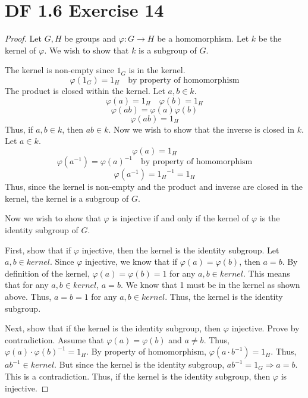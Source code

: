 \documentclass{article}
\begin{document}
\section{DF 1.6 Exercise 14}
\begin{proof}
Let $G, H$ be groups and $\varphi: G \rightarrow H$ be a homomorphism. Let $k$ be the kernel of $\varphi$. We wish to show that $k$ is a subgroup of $G$.

The kernel is non-empty since $1_G$ is in the kernel.
\[
\varphi(1_G) = 1_H \quad \textrm{by property of homomorphism}
\]
The product is closed within the kernel. Let $a, b \in k$.
\[
\varphi(a) = 1_H \quad \varphi(b) = 1_H
\]
\[
\varphi(ab) = \varphi(a)\varphi(b)
\]
\[
\varphi(ab) = 1_H
\]
Thus, if $a, b \in k$, then $ab \in k$. Now we wish to show that the inverse is closed in $k$. Let $a \in k$.
\[
\varphi(a) = 1_H
\]
\[
\varphi(a^{-1}) = \varphi(a)^{-1} \quad \textrm{by property of homomorphism}
\]
\[
\varphi(a^{-1}) = {1_H}^{-1} = 1_H
\]
Thus, since the kernel is non-empty and the product and inverse are closed in the kernel, the kernel is a subgroup of $G$.

Now we wish to show that $\varphi$ is injective if and only if the kernel of $\varphi$ is the identity subgroup of $G$. 

First, show that if $\varphi$ injective, then the kernel is the identity subgroup. Let $a,b \in kernel$. Since $\varphi$ injective, we know that if $\varphi(a) = \varphi(b)$, then $a=b$. By definition of the kernel, $\varphi(a) = \varphi(b) = 1$ for any $a, b \in kernel$. This means that for any $a, b \in kernel$, $a = b$. We know that 1 must be in the kernel as shown above. Thus, $a=b=1$ for any $a,b \in kernel$. Thus, the kernel is the identity subgroup.

Next, show that if the kernel is the identity subgroup, then $\varphi$ injective. Prove by contradiction. Assume that $\varphi(a)=\varphi(b)$ and $a \neq b$. Thus, $\varphi(a) \cdot \varphi(b)^{-1} = 1_H$. By property of homomorphism, $\varphi(a \cdot b^{-1}) = 1_H$. Thus, $ab^{-1} \in kernel$. But since the kernel is the identity subgroup, $ab^{-1}=1_G \Rightarrow a=b$. This is a contradiction. Thus, if the kernel is the identity subgroup, then $\varphi$ is injective.
\end{proof}
\end{document}
